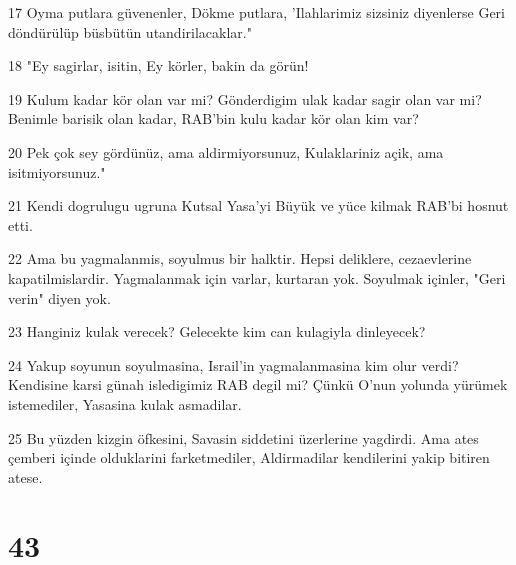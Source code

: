 \par 17 Oyma putlara güvenenler, Dökme putlara, 'Ilahlarimiz sizsiniz diyenlerse Geri döndürülüp büsbütün utandirilacaklar."
\par 18 "Ey sagirlar, isitin, Ey körler, bakin da görün!
\par 19 Kulum kadar kör olan var mi? Gönderdigim ulak kadar sagir olan var mi? Benimle barisik olan kadar, RAB'bin kulu kadar kör olan kim var?
\par 20 Pek çok sey gördünüz, ama aldirmiyorsunuz, Kulaklariniz açik, ama isitmiyorsunuz."
\par 21 Kendi dogrulugu ugruna Kutsal Yasa'yi Büyük ve yüce kilmak RAB'bi hosnut etti.
\par 22 Ama bu yagmalanmis, soyulmus bir halktir. Hepsi deliklere, cezaevlerine kapatilmislardir. Yagmalanmak için varlar, kurtaran yok. Soyulmak içinler, "Geri verin" diyen yok.
\par 23 Hanginiz kulak verecek? Gelecekte kim can kulagiyla dinleyecek?
\par 24 Yakup soyunun soyulmasina, Israil'in yagmalanmasina kim olur verdi? Kendisine karsi günah isledigimiz RAB degil mi? Çünkü O'nun yolunda yürümek istemediler, Yasasina kulak asmadilar.
\par 25 Bu yüzden kizgin öfkesini, Savasin siddetini üzerlerine yagdirdi. Ama ates çemberi içinde olduklarini farketmediler, Aldirmadilar kendilerini yakip bitiren atese.

\chapter{43}

